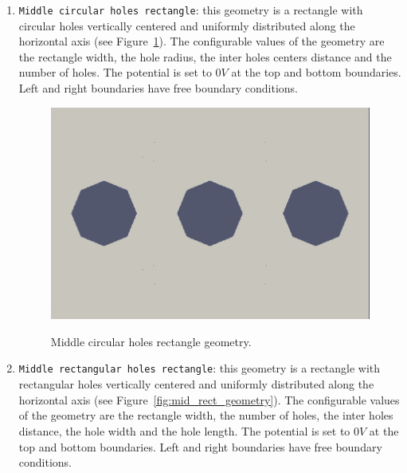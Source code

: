 \documentclass[11pt]{article}
\begin{document}
	\begin{enumerate}
		\item \texttt{Middle circular holes rectangle}: this geometry is a rectangle with circular
			holes vertically centered and uniformly distributed along the horizontal axis (see
			Figure~\ref{fig:mid_circle_geometry}). The configurable values of the geometry
			are the rectangle width,
			the hole radius, the inter holes centers distance and the number of holes.
			The potential is set to $0V$ at the top and bottom boundaries. Left and right
			boundaries have free boundary conditions.

		\begin{figure}[H]
		  \center
		  \includegraphics[scale=0.2]{images/detector_types/mid_circle_geometry.png}
		  \label{fig:mid_circle_geometry}
		  \caption{Middle circular holes rectangle geometry.}
		\end{figure}


		\item \texttt{Middle rectangular holes rectangle}: this geometry is a rectangle with rectangular
			holes vertically centered and uniformly distributed along the horizontal axis
			(see Figure~\ref{fig:mid_rect_geometry}).
			The configurable values of the geometry are the rectangle width, the number of
			holes, the inter holes distance, the hole width and the hole length.
			The potential is set to $0V$ at the top and bottom boundaries. Left and right
			boundaries have free boundary conditions.


\end{enumerate}
\end{document}
